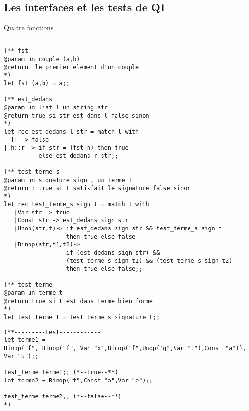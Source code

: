 \documentclass[12pt]{amsart}
\begin{document}
\subsection{Les interfaces et les tests de Q1} Quatre fonctions

\begin{lstlisting}
         
(** fst
@param un couple (a,b)
@return  le premier element d'un couple
*)
let fst (a,b) = a;;

(** est_dedans
@param un list l un string str
@return true si str est dans l false sinon
*)
let rec est_dedans l str = match l with
  [] -> false
| h::r -> if str = (fst h) then true
          else est_dedans r str;;
          
(** test_terme_s
@param un signature sign , un terme t
@return : true si t satisfait le signature false sinon
*)
let rec test_terme_s sign t = match t with
   |Var str -> true
   |Const str -> est_dedans sign str
   |Unop(str,t)-> if est_dedans sign str && test_terme_s sign t 
                  then true else false
   |Binop(str,t1,t2)-> 
                  if (est_dedans sign str) && 
                  (test_terme_s sign t1) && (test_terme_s sign t2) 
                  then true else false;;
                  
(** test_terme
@param un terme t
@return true si t est dans terme bien forme
*)                        
let test_terme t = test_terme_s signature t;; 
             \end{lstlisting}

     \begin{lstlisting}
(**---------test------------
let terme1 = 
Binop("f", Binop("f", Var "x",Binop("f",Unop("g",Var "t"),Const "a")), Var "u");; 

test_terme terme1;; (*--true--**)                        
let terme2 = Binop("t",Const "a",Var "e");; 

test_terme terme2;; (*--false--**)          
*)     
 \end{lstlisting}
 
\end{document}
